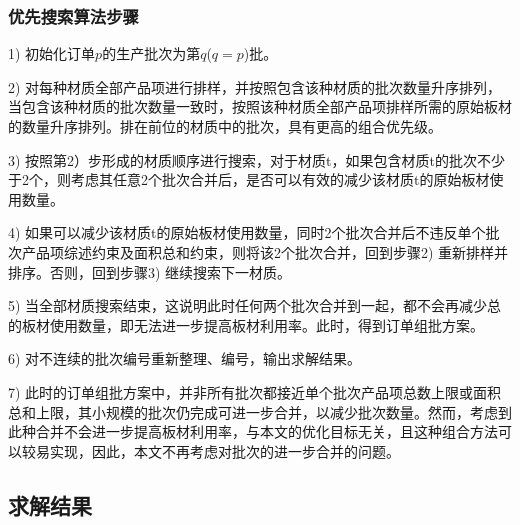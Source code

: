 \documentclass[bwprint]{gmcmthesis}
\begin{document}
\subsubsection{优先搜索算法步骤}

1) 初始化订单$p$的生产批次为第$q$($q=p$)批。

2) 对每种材质全部产品项进行排样，并按照包含该种材质的批次数量升序排列，当包含该种材质的批次数量一致时，按照该种材质全部产品项排样所需的原始板材的数量升序排列。排在前位的材质中的批次，具有更高的组合优先级。

3) 按照第2）步形成的材质顺序进行搜索，对于材质t，如果包含材质t的批次不少于2个，则考虑其任意2个批次合并后，是否可以有效的减少该材质t的原始板材使用数量。

4) 如果可以减少该材质t的原始板材使用数量，同时2个批次合并后不违反单个批次产品项综述约束及面积总和约束，则将该2个批次合并，回到步骤2) 重新排样并排序。否则，回到步骤3) 继续搜索下一材质。

5) 当全部材质搜索结束，这说明此时任何两个批次合并到一起，都不会再减少总的板材使用数量，即无法进一步提高板材利用率。此时，得到订单组批方案。

6) 对不连续的批次编号重新整理、编号，输出求解结果。

7) 此时的订单组批方案中，并非所有批次都接近单个批次产品项总数上限或面积总和上限，其小规模的批次仍完成可进一步合并，以减少批次数量。然而，考虑到此种合并不会进一步提高板材利用率，与本文的优化目标无关，且这种组合方法可以较易实现，因此，本文不再考虑对批次的进一步合并的问题。


\subsection{求解结果}
\end{document}
